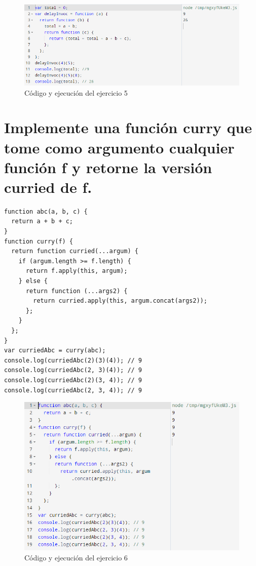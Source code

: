 \documentclass{article}
\begin{document}
\begin{figure}
\centering
\includegraphics[width=1\textwidth]{ejercicio5.png}
\caption{\label{fig:frog}Código y ejecución del ejercicio 5}
\end{figure}

\section{Implemente una función curry que tome como argumento cualquier función f y retorne la versión curried de f.}

\begin{verbatim}
function abc(a, b, c) {
  return a + b + c;
}
function curry(f) {
  return function curried(...argum) {
    if (argum.length >= f.length) {
      return f.apply(this, argum);
    } else {
      return function (...args2) {
        return curried.apply(this, argum.concat(args2));
      };
    }
  };
}
var curriedAbc = curry(abc);
console.log(curriedAbc(2)(3)(4)); // 9
console.log(curriedAbc(2, 3)(4)); // 9
console.log(curriedAbc(2)(3, 4)); // 9
console.log(curriedAbc(2, 3, 4)); // 9
\end{verbatim}

\begin{figure}
\centering
\includegraphics[width=1\textwidth]{ejercicio6.png} 
\caption{\label{fig:frog}Código y ejecución del ejercicio 6}
\end{figure}
\end{document}
